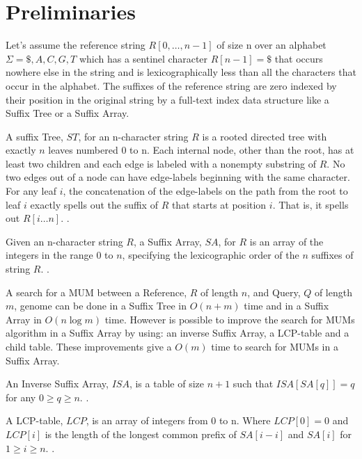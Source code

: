 \documentclass{acm_proc_article-sp}
\begin{document}
\section{Preliminaries}
Let's assume the reference string $R[0,\ldots, n − 1]$ of size n over an alphabet $\Sigma={ \$, A, C, G, T}$ which has a sentinel character $R[n − 1] = \$$ that occurs nowhere else in the string and is lexicographically less than all the characters that occur in the alphabet. The suffixes of the reference string are zero indexed by their position in the original string by a full-text index data structure like a Suffix Tree or a Suffix Array. 

\begin{definition}
A suffix Tree, $ST$, for an n-character string $R$ is a rooted directed tree with exactly $n$ leaves numbered 0 to n. Each internal node, other than the root, has at least two children and each edge is labeled with a nonempty substring of $R$. No two edges out of a node can have edge-labels beginning with the same character. For any leaf $i$, the concatenation of the edge-labels on the path from the root to leaf $i$ exactly spells out the suffix of $R$ that starts at position $i$. That is, it spells out $R[i\ldots n]$. \cite{Gusfield1997}.
\end{definition}
\begin{definition}
Given an n-character string $R$, a Suffix Array, $SA$, for $R$ is an array of the integers in the range 0 to $n$, specifying the lexicographic order of the $n$ suffixes of string $R$. \cite{Gusfield1997}.
\end{definition}
A search for a MUM between a Reference, $R$ of length $n$, and Query, $Q$ of length $m$, genome can be done in a Suffix Tree in $O(n+m)$ time and in a Suffix Array in $O(n\log m)$ time. However is possible to improve the search for MUMs algorithm in a Suffix Array by using: an inverse Suffix Array, a LCP-table and a child table. These improvements give a $O(m)$ time \cite{Abouelhoda2004} to search for MUMs in a Suffix Array.
\begin{definition}
An Inverse Suffix Array, $ISA$, is a table of size $n+1$ such that $ISA[SA[q]]=q$ for any $0\geq q\geq n$. \cite{Abouelhoda2004}.
\end{definition}
\begin{definition}
A LCP-table, $LCP$, is an array of integers from 0 to n. Where $LCP[0]=0$ and $LCP[i]$ is the length of the longest common prefix of $SA[i-i]$ and $SA[i]$ for $1\geq i \geq n$. \cite{Abouelhoda2004}.
\end{definition}
\end{document}
